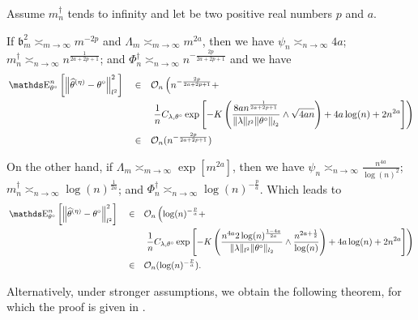 \begin{il}\label{IL_FREQ_CIRCDECONV_KNOWN_IID_ORACLE_NP}
Assume $m^{\dagger}_{n}$ tends to infinity and let be two positive real numbers $p$ and $a$.

If $\mathfrak{b}_{m}^{2} \asymp_{m \rightarrow \infty} m^{-2p}$ and $\Lambda_{m} \asymp_{m \rightarrow \infty} m^{2a}$, then we have $\psi_{n} \asymp_{n \rightarrow \infty} 4a$; $m^{\dagger}_{n} \asymp_{n \rightarrow \infty} n^{\frac{1}{2a + 2p + 1}}$; and $\Phi^{\dagger}_{n} \asymp_{n \rightarrow \infty} n^{-\frac{2p}{2a + 2p + 1}}$ and we have
\begin{alignat*}{3}
& \E_{\theta^{\circ}}^{n}\left[\left\Vert \widehat{\theta}^{(\eta)} - \theta^{\circ} \right\Vert_{l^{2}}^{2}\right] && \in && \mathcal{O}_{n}\left(n^{-\frac{2p}{2a + 2p + 1}} +\right.\\
& && && \left. \frac{1}{n} C_{\lambda, \theta^{\circ}} \exp\left[- K \left(\frac{8 a n^{\frac{1}{2a + 2p + 1}}}{\Vert \lambda \Vert_{l^{2}} \Vert \theta^{\circ} \Vert_{l_{2}}} \wedge \sqrt{4 a n}\right) + 4 a \log(n) + 2 n^{2a} \right]\right)\\
& && \in && \mathcal{O}_{n}(n^{-\frac{2p}{2a + 2p + 1}})
\end{alignat*}

\medskip

On the other hand, if $\Lambda_{m} \asymp_{m \rightarrow \infty} \exp\left[m^{2a}\right]$, then we have $\psi_{n} \asymp_{n \rightarrow \infty} \frac{n^{4a}}{\log(n)^{2}}$; $m^{\dagger}_{n} \asymp_{n \rightarrow \infty} \log(n)^{\frac{1}{2a}}$; and $\Phi^{\dagger}_{n} \asymp_{n \rightarrow \infty} \log(n)^{-\frac{p}{a}}$.
Which leads to
\begin{alignat*}{3}
& \E_{\theta^{\circ}}^{n}\left[\left\Vert \widehat{\theta}^{(\eta)} - \theta^{\circ} \right\Vert_{l^{2}}^{2}\right] && \in && \mathcal{O}_{n}\left(\log(n)^{-\frac{p}{a}} + \right. \\
& && && \left. \frac{1}{n} C_{\lambda, \theta^{\circ}} \exp\left[- K \left(\frac{n^{4a} 2 \log(n)^{\frac{1 - 4a}{2a}}}{\Vert \lambda \Vert_{l^{2}} \Vert \theta^{\circ} \Vert_{l_{2}}} \wedge \frac{n^{2a + \frac{1}{2}}}{\log(n)}\right) + 4 a \log(n) + 2 n^{2a} \right]\right)\\
& && \in && \mathcal{O}_{n}(\log(n)^{-\frac{p}{a}}).
\end{alignat*}
\end{il}

Alternatively, under stronger assumptions, we obtain the following theorem, for which the proof is given in .

